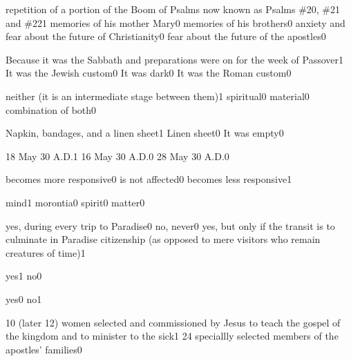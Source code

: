 {repetition of a portion of the Boom of Psalms now known as Psalms \#20, \#21 and \#22}{1}
{memories of his mother Mary}{0}
{memories of his brothers}{0}
{anxiety and fear about the future of Christianity}{0}
{fear about the future of the apostles}{0}
\qstop

{Because it was the Sabbath and preparations were on for the week of Passover}{1}
{It was the Jewish custom}{0}
{It was dark}{0}
{It was the Roman custom}{0}
\qstop

{neither (it is an intermediate stage between them)}{1}
{spiritual}{0}
{material}{0}
{combination of both}{0}
\qstop

{Napkin, bandages, and a linen sheet}{1}
{Linen sheet}{0}
{It was empty}{0}
\qstop

{18 May 30 A.D.}{1}
{16 May 30 A.D.}{0}
{28 May 30 A.D.}{0}
\qstop

{becomes more responsive}{0}
{is not affected}{0}
{becomes less responsive}{1}
\qstop

{mind}{1}
{morontia}{0}
{spirit}{0}
{matter}{0}
\qstop

{yes, during every trip to Paradise}{0}
{no, never}{0}
{yes, but only if the transit is to culminate in Paradise citizenship (as opposed to mere visitors who remain creatures of time)}{1}
\qstop

{yes}{1}
{no}{0}
\qstop

{yes}{0}
{no}{1}
\qstop

{10 (later 12) women selected and commissioned by Jesus to teach the gospel of the kingdom and to minister to the sick}{1}
{24 speciallly selected members of the apostles' families}{0}
\qstop

